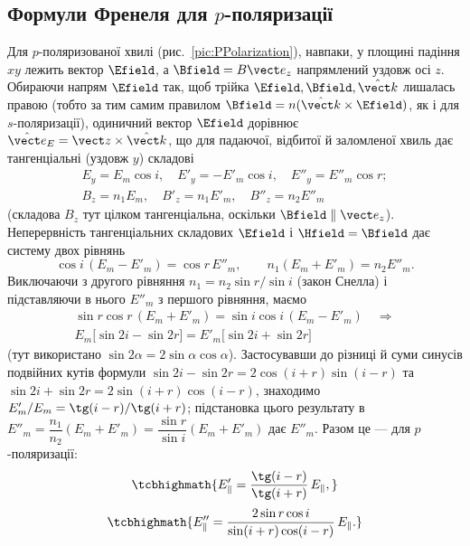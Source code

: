 \subsection*{Формули Френеля для $p$-поляризації}

Для $p$-поляризованої хвилі (рис.~\ref{pic:PPolarization}), навпаки, у площині падіння $xy$ лежить вектор $\Efield$, а $\Bfield=B\vect e_z$
напрямлений уздовж осі $z$. Обираючи напрям $\Efield$ так, щоб трійка $\Efield,\Bfield,\hat{\vect k}$ лишалась правою (тобто за тим самим
правилом $\Bfield=n(\hat{\vect k}\times\Efield)$, як і для $s$-поляризації), одиничний вектор $\Efield$ дорівнює $\hat{\vect e}_E=\vect
z\times\hat{\vect k}$, що для падаючої, відбитої й заломленої хвиль дає тангенціальні (уздовж $y$) складові
\begin{multline*}
	E_y = E_m\cos i,\quad E'_y=-E'_m\cos i,\quad E''_y=E''_m\cos r; \\ B_z=n_1E_m,\quad B'_z=n_1E'_m,\quad B''_z=n_2E''_m
\end{multline*}
(складова $B_z$ тут цілком тангенціальна, оскільки $\Bfield\parallel\vect e_z$). Неперервність тангенціальних складових $\Efield$ і
$\Hfield=\Bfield$ дає систему двох рівнянь
\begin{equation}\label{eq:FresnelPBoundary}
	\cos i\,(E_m-E'_m) = \cos r\,E''_m, \qquad n_1(E_m+E'_m)=n_2E''_m.
\end{equation}
Виключаючи з другого рівняння $n_1=n_2\sin r/\sin i$ (закон Снелла) і підставляючи в нього $E''_m$ з першого рівняння, маємо
\begin{multline*}
	\sin r\cos r\,(E_m+E'_m) = \sin i\cos i\,(E_m-E'_m) \quad\Longrightarrow\\E_m\big[\sin2i-\sin2r\big] = E'_m\big[\sin2i+\sin2r\big]
\end{multline*}
(тут використано $\sin2\alpha=2\sin\alpha\cos\alpha$). Застосувавши до різниці й суми синусів подвійних кутів формули $\sin2i-\sin2r=2\cos(i+r)\sin(i-r)$
та $\sin2i+\sin2r=2\sin(i+r)\cos(i-r)$, знаходимо $E'_m/E_m=\tg(i-r)/\tg(i+r)$; підстановка цього результату в $E''_m=\dfrac{n_1}{n_2}(E_m+E'_m)=\dfrac{\sin
r}{\sin i}(E_m+E'_m)$ дає $E''_m$. Разом це ---  для $p$-поляризації:
\begin{equation}\label{eq:FresnelPReflection}
	\tcbhighmath{
		E'_\parallel = \frac{\tg(i-r)}{\tg(i+r)}\, E_\parallel,
	}
\end{equation}
\begin{equation}\label{eq:FresnelPTransmission}
	\tcbhighmath{
		E''_\parallel = \frac{2\sin r\cos i}{\sin(i+r)\cos(i-r)}\, E_\parallel.
	}
\end{equation}


